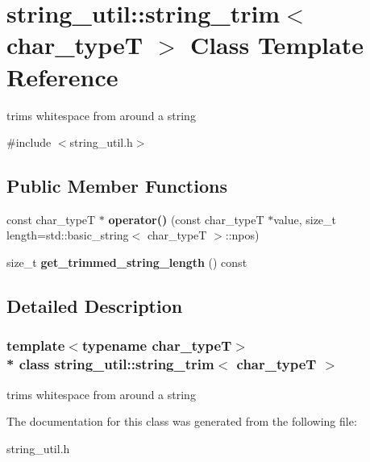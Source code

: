 \section{string\+\_\+util\+:\+:string\+\_\+trim$<$ char\+\_\+typeT $>$ Class Template Reference}
\label{classstring__util_1_1string__trim}


trims whitespace from around a string  




{\ttfamily \#include $<$string\+\_\+util.\+h$>$}

\subsection*{Public Member Functions}
\begin{DoxyCompactItemize}
\item 
const char\+\_\+typeT $\ast$ {\bfseries operator()} (const char\+\_\+typeT $\ast$value, size\+\_\+t length=std\+::basic\+\_\+string$<$ char\+\_\+typeT $>$\+::npos)\label{classstring__util_1_1string__trim_a33ce709a5bd7a1fd2d974a0940fc1ff8}

\item 
size\+\_\+t {\bfseries get\+\_\+trimmed\+\_\+string\+\_\+length} () const \label{classstring__util_1_1string__trim_abea837c5d6ef343a91b161d039162ecb}

\end{DoxyCompactItemize}


\subsection{Detailed Description}
\subsubsection*{template$<$typename char\+\_\+typeT$>$\\*
class string\+\_\+util\+::string\+\_\+trim$<$ char\+\_\+type\+T $>$}

trims whitespace from around a string 

The documentation for this class was generated from the following file\+:\begin{DoxyCompactItemize}
\item 
string\+\_\+util.\+h\end{DoxyCompactItemize}
